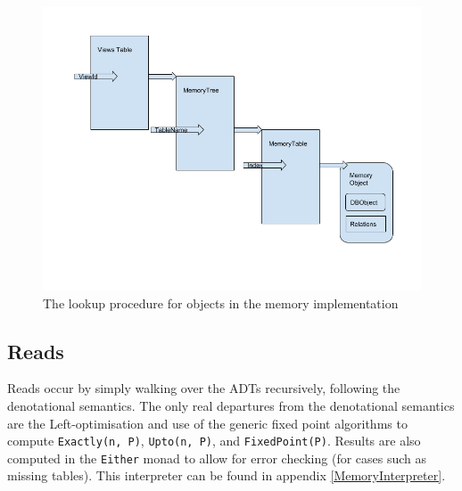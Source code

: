 \documentclass[12pt,a4paper,twoside,openright]{report}
\newcommand\codeName[1]{\texttt{#1}}
\begin{document}
\begin{figure}[ht]
\centering
  \includegraphics[width=\textwidth]{figs/MemoryHierarchy.png}
  \caption{The lookup procedure for objects in the memory implementation}
  \label{fig:MemoryHierarchy}
\end{figure}

	
	\subsection{Reads}
Reads occur by simply walking over the ADTs recursively, following the denotational semantics. The only real departures from the denotational semantics are the Left-optimisation and use of the generic fixed point algorithms to compute \codeName{Exactly(n, P)}, \codeName{Upto(n, P)}, and \codeName{FixedPoint(P)}. Results are also computed in the \codeName{Either} monad to allow for error checking (for cases such as missing tables). This interpreter can be found in appendix \ref{MemoryInterpreter}.
	
\end{document}
